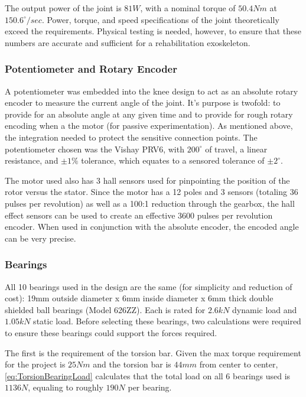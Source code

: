 The output power of the joint is \(81 W\), with a nominal torque of \(50.4 Nm\) at \(150.6^\circ/sec\). Power, torque, and speed specifications of the joint theoretically exceed the requirements. Physical testing is needed, however, to ensure that these numbers are accurate and sufficient for a rehabilitation exoskeleton.
 
\subsubsection{Potentiometer and Rotary Encoder}
A potentiometer was embedded into the knee design to act as an absolute rotary encoder to measure the current angle of the joint. It's purpose is twofold: to provide for an absolute angle at any given time and to provide for rough rotary encoding when a the motor (for passive experimentation). As mentioned above, the integration needed to protect the sensitive connection points. The potentiometer chosen was the Vishay PRV6, with \(200^\circ\) of travel, a linear resistance, and \(\pm 1\%\) tolerance, which equates to a sensored tolerance of \(\pm 2^\circ\). 

The motor used also has 3 hall sensors used for pinpointing the position of the rotor versus the stator. Since the motor has a 12 poles and 3 sensors (totaling 36 pulses per revolution) as well as a 100:1 reduction through the gearbox, the hall effect sensors can be used to create an effective 3600 pulses per revolution encoder. When used in conjunction with the absolute encoder, the encoded angle can be very precise.


\subsubsection{Bearings}
\label{sec:BearingsAndCalcs}
All 10 bearings used in the design are the same (for simplicity and reduction of cost): 19mm outside diameter x 6mm inside diameter x 6mm thick double shielded ball bearings (Model 626ZZ). Each is rated for \(2.6kN\) dynamic load and \(1.05kN\) static load. Before selecting these bearings, two calculations were required to ensure these bearings could support the forces required.

The first is the requirement of the torsion bar. Given the max torque requirement for the project is \(25Nm\) and the torsion bar is \(44mm\) from center to center, \autoref{eq:TorsionBearingLoad} calculates that the total load on all 6 bearings used is \(1136N\), equaling to roughly \(190N\) per bearing.

